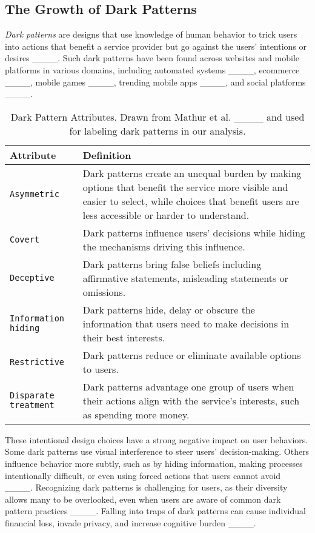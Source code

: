 \subsection{The Growth of Dark Patterns} %
\textit{Dark patterns} are designs that use knowledge of human behavior to trick users into actions that benefit a service provider but go against the users' intentions or desires {____}. Such dark patterns have been found across websites and mobile platforms in various domains, including automated systems ____, ecommerce ____, mobile games ____, trending mobile apps ____, and social platforms ____.

\setlength{\intextsep}{0pt}
\begin{wraptable}[25]{r}{8cm}
\begin{tabular}{l p{4.5cm}}\toprule  
Attribute & Definition \\\midrule
\texttt{Asymmetric}& Dark patterns create an unequal burden by making options that benefit the service more visible and easier to select, while choices that benefit users are less accessible or harder to understand. \\
\texttt{Covert}& Dark patterns influence users' decisions while hiding the mechanisms driving this influence.\\  
\texttt{Deceptive} & Dark patterns bring false beliefs including affirmative statements, misleading statements or omissions.\\  
\texttt{Information hiding} & Dark patterns hide, delay or obscure the information that users need to make decisions in their best interests.\\
\texttt{Restrictive} & Dark patterns reduce or eliminate available options to users. \\
\texttt{Disparate treatment}& Dark patterns advantage one group of users when their actions align with the service's interests, such as spending more money.\\
\bottomrule
\end{tabular}
\caption{Dark Pattern Attributes. Drawn from Mathur et al. ____ and used for labeling dark patterns in our analysis.}\label{tab:darkpattern-definitions}
\end{wraptable}

These intentional design choices have a strong negative impact on user behaviors. Some dark patterns use visual interference to steer users' decision-making. Others influence behavior more subtly, such as by hiding information, making processes intentionally difficult, or even using forced actions that users cannot avoid ____. Recognizing dark patterns is challenging for users, as their diversity allows many to be overlooked, even when users are aware of common dark pattern practices ____. Falling into traps of dark patterns can cause individual financial loss, invade privacy, and increase cognitive burden ____.

